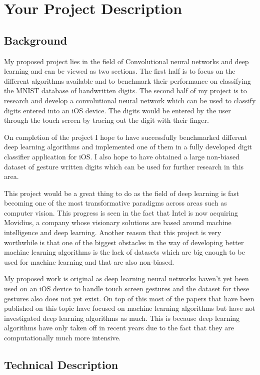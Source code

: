 \documentclass[]{weekly-report}
\begin{document}
\section{Your Project Description}

\subsection{Background}

My proposed project lies in the field of Convolutional neural networks and deep learning and can be viewed as two sections. The first half is to focus on the different algorithms available and to benchmark their performance on classifying the MNIST database of handwritten digits. The second half of my project is to research and develop a convolutional neural network which can be used to classify digits entered into an iOS device. The digits would be entered by the user through the touch screen by tracing out the digit with their finger.

On completion of the project I hope to have successfully benchmarked different deep learning algorithms and implemented one of them in a fully developed digit classifier application for iOS. I also hope to have obtained a large non-biased dataset of gesture written digits which can be used for further research in this area.

This project would be a great thing to do as the field of deep learning is fast becoming one of the most transformative paradigms across areas such as computer vision. This progress is seen in the fact that Intel is now acquiring Movidius, a company whose visionary solutions are based around machine intelligence and deep learning. Another reason that this project is very worthwhile is that one of the biggest obstacles in the way of developing better machine learning algorithms is the lack of datasets which are big enough to be used for machine learning and that are also non-biased.

My proposed work is original as deep learning neural networks haven't yet been used on an iOS device to handle touch screen gestures and the dataset for these gestures also does not yet exist. On top of this most of the papers that have been published on this topic have focused on machine learning algorithms but have not investigated deep learning algorithms as much. This is because deep learning algorithms have only taken off in recent years due to the fact that they are computationally much more intensive.

\subsection{Technical Description}
\end{document}
